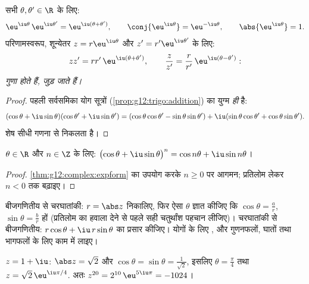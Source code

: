 \begin{theorem}\label{thm:g12:complex:expform}
सभी $\theta, \theta' \in \R$ के लिए:
\[
\eu^{\iu\theta}\,\eu^{\iu\theta'} = \eu^{\iu(\theta + \theta')},
\qquad
\conj{\eu^{\iu\theta}} = \eu^{-\iu\theta},
\qquad
\abs{\eu^{\iu\theta}} = 1 .
\]
परिणामस्वरूप, शून्येतर $z = r\eu^{\iu\theta}$ और $z' = r'\eu^{\iu\theta'}$ के लिए:
\[
zz' = rr'\,\eu^{\iu(\theta+\theta')},
\qquad
\frac{z}{z'} = \frac{r}{r'}\,\eu^{\iu(\theta - \theta')} :
\]
\emph{ गुणा होते हैं,  जुड़ जाते हैं।}
\end{theorem}

\begin{proof}
पहली सर्वसमिका योग सूत्रों (\cref{prop:g12:trigo:addition}) का युग्म \emph{ही} है:
\[
(\cos\theta + \iu\sin\theta)(\cos\theta' + \iu\sin\theta')
= (\cos\theta\cos\theta' - \sin\theta\sin\theta')
+ \iu(\sin\theta\cos\theta' + \cos\theta\sin\theta').
\]
शेष सीधी गणना से निकलता है।
\end{proof}

\begin{corollary}[दे म्वाव्र का सूत्र]\label{cor:g12:complex:demoivre}
$\theta \in \R$ और $n \in \Z$ के लिए: $\bigl(\cos\theta + \iu\sin\theta\bigr)^n = \cos n\theta + \iu \sin n\theta$।
\end{corollary}

\begin{proof}
\cref{thm:g12:complex:expform} का उपयोग करके $n \geq 0$ पर आगमन; प्रतिलोम लेकर $n < 0$ तक बढ़ाइए।
\end{proof}

\begin{method}[रूपों के बीच आना-जाना]\label{met:g12:complex:forms}
बीजगणितीय से चरघातांकी: $r = \abs z$ निकालिए, फिर ऐसा $\theta$ ज्ञात कीजिए कि $\cos\theta = \frac ar$, $\sin\theta = \frac br$
हों (प्रतिलोम  का हवाला देने से पहले सही चतुर्थांश पहचान लीजिए)।
चरघातांकी से बीजगणितीय: $r\cos\theta + \iu\, r\sin\theta$ का प्रसार कीजिए। योगों के लिए , और
गुणनफलों, घातों तथा भागफलों के लिए  काम में लाइए।
\end{method}

\begin{example}
$z = 1 + \iu$: $\abs z = \sqrt2$ और $\cos\theta = \sin\theta =
\frac{1}{\sqrt2}$, इसलिए $\theta = \frac\pi4$ तथा $z = \sqrt2\,\eu^{\iu\pi/4}$. अतः $z^{20} = 2^{10}\,\eu^{5\iu\pi} = -1024$।
\end{example}

